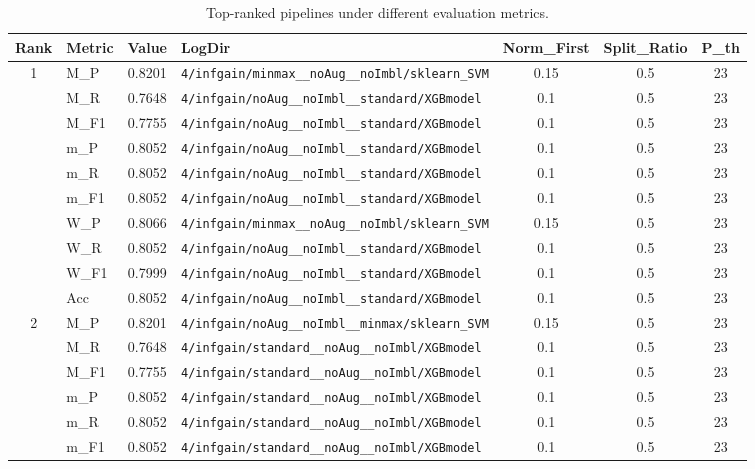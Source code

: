 \begin{table}[htbp]
\caption{Top-ranked pipelines under different evaluation metrics.}
\label{tab:rank_metric_vertical}
\centering
\small
\setlength{\tabcolsep}{4pt}
\begin{tabular}{|c|l|c|>{\ttfamily\footnotesize}p{7.2cm}|c|c|c|}
\hline
Rank & Metric & Value & LogDir & Norm\_First & Split\_Ratio & P\_th \\
\hline
\multirow{10}{*}{1} & M\_P & 0.8201 & \texttt{4/infgain/minmax\_\_noAug\_\_noImbl/sklearn\_SVM} & 0.15 & 0.5  & 23 \\ 
 & M\_R & 0.7648 & \texttt{4/infgain/noAug\_\_noImbl\_\_standard/XGBmodel} & 0.1 & 0.5  & 23 \\ 
 & M\_F1 & 0.7755 & \texttt{4/infgain/noAug\_\_noImbl\_\_standard/XGBmodel} & 0.1 & 0.5  & 23 \\ 
 & m\_P & 0.8052 & \texttt{4/infgain/noAug\_\_noImbl\_\_standard/XGBmodel} & 0.1 & 0.5  & 23 \\ 
 & m\_R & 0.8052 & \texttt{4/infgain/noAug\_\_noImbl\_\_standard/XGBmodel} & 0.1 & 0.5  & 23 \\ 
 & m\_F1 & 0.8052 & \texttt{4/infgain/noAug\_\_noImbl\_\_standard/XGBmodel} & 0.1 & 0.5  & 23 \\ 
 & W\_P & 0.8066 & \texttt{4/infgain/minmax\_\_noAug\_\_noImbl/sklearn\_SVM} & 0.15 & 0.5  & 23 \\ 
 & W\_R & 0.8052 & \texttt{4/infgain/noAug\_\_noImbl\_\_standard/XGBmodel} & 0.1 & 0.5  & 23 \\ 
 & W\_F1 & 0.7999 & \texttt{4/infgain/noAug\_\_noImbl\_\_standard/XGBmodel} & 0.1 & 0.5  & 23 \\ 
 & Acc & 0.8052 & \texttt{4/infgain/noAug\_\_noImbl\_\_standard/XGBmodel} & 0.1 & 0.5  & 23 \\ 
\hline
\multirow{10}{*}{2} & M\_P & 0.8201 & \texttt{4/infgain/noAug\_\_noImbl\_\_minmax/sklearn\_SVM} & 0.15 & 0.5  & 23 \\ 
 & M\_R & 0.7648 & \texttt{4/infgain/standard\_\_noAug\_\_noImbl/XGBmodel} & 0.1 & 0.5  & 23 \\ 
 & M\_F1 & 0.7755 & \texttt{4/infgain/standard\_\_noAug\_\_noImbl/XGBmodel} & 0.1 & 0.5  & 23 \\ 
 & m\_P & 0.8052 & \texttt{4/infgain/standard\_\_noAug\_\_noImbl/XGBmodel} & 0.1 & 0.5  & 23 \\ 
 & m\_R & 0.8052 & \texttt{4/infgain/standard\_\_noAug\_\_noImbl/XGBmodel} & 0.1 & 0.5  & 23 \\ 
 & m\_F1 & 0.8052 & \texttt{4/infgain/standard\_\_noAug\_\_noImbl/XGBmodel} & 0.1 & 0.5  & 23 \\ 

\end{tabular}
\end{table}
